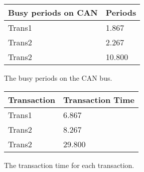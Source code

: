     \renewcommand{\arraystretch}{1.4}
    \begin{figure}[H]
    \centering
    \begin{minipage}{0.5\textwidth}
        \begin{table}[H]
        \centering
        \begin{tabular}{|l|l|}
            \hline
            \rowcolor{green!40}\textbf{Busy periods on CAN}  & \textbf{Periods} \\ \hline
            Trans1                                  & 1.867                     \\ \hline
            Trans2                                  & 2.267                     \\ \hline
            Trans2                                  & 10.800                    \\ \hline
        \end{tabular}
        \end{table}
    \end{minipage}%
    \caption{The busy periods on the CAN bus.}
    \label{fig:busyperiods}
    \end{figure}
    \renewcommand{\arraystretch}{1.0}

    \renewcommand{\arraystretch}{1.4}
    \begin{figure}[H]
    \centering
    \begin{minipage}{0.5\textwidth}
        \begin{table}[H]
        \centering
        \begin{tabular}{|l|l|}
            \hline
            \rowcolor{green!40}\textbf{Transaction}  & \textbf{Transaction Time} \\ \hline
            Trans1                                  & 6.867                     \\ \hline
            Trans2                                  & 8.267                     \\ \hline
            Trans2                                  & 29.800                    \\ \hline
        \end{tabular}
        \end{table}
    \end{minipage}%
    \caption{The transaction time for each transaction.}
    \label{fig:transactiontime}
    \end{figure}
    \renewcommand{\arraystretch}{1.0}
